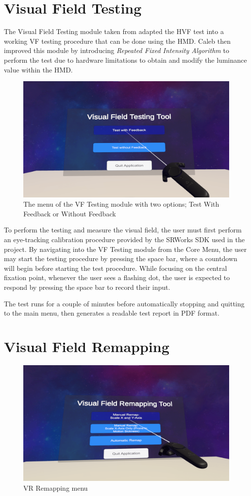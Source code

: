 \documentclass{l4proj}
\begin{document}
\section{Visual Field Testing}
The Visual Field Testing module taken from \cite{Macintosh2024} adapted the HVF test into a working VF testing procedure that can be done using the HMD. Caleb then improved this module by introducing \textit{Repeated Fixed Intensity Algorithm} to perform the test due to hardware limitations to obtain and modify the luminance value within the HMD.
\begin{figure}[!h]
    \centering
    \includegraphics[width=0.8\linewidth]{images/VRView_VFT.png}
    \caption{The menu of the VF Testing module with two options; Test With Feedback or Without Feedback}
    \label{fig:VFTview}
\end{figure}

To perform the testing and measure the visual field, the user must first perform an eye-tracking calibration procedure provided by the SRWorks SDK used in the project. By navigating into the VF Testing module from the Core Menu, the user may start the testing procedure by pressing the space bar, where a countdown will begin before starting the test procedure. While focusing on the central fixation point, whenever the user sees a flashing dot, the user is expected to respond by pressing the space bar to record their input.

The test runs for a couple of minutes before automatically stopping and quitting to the main menu, then generates a readable test report in PDF format.


\section{Visual Field Remapping}

\begin{figure}
    \centering
    \includegraphics[width=0.8\linewidth]{images/VRView_VFR.png}
    \caption{VR Remapping menu}
    \label{fig:VFRView}
\end{figure}
\end{document}
